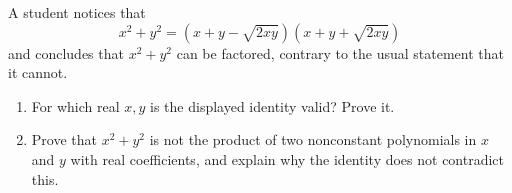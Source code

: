 A student notices that
\[
x^2+y^2=\left(x+y-\sqrt{2xy}\right)\left(x+y+\sqrt{2xy}\right)
\]
and concludes that $x^2+y^2$ can be factored, contrary to the usual statement that it cannot.
\begin{enumerate}
\item For which real $x,y$ is the displayed identity valid? Prove it.
\item Prove that $x^2+y^2$ is not the product of two nonconstant polynomials in $x$ and $y$ with real coefficients, and explain why the identity does not contradict this.
\end{enumerate}
